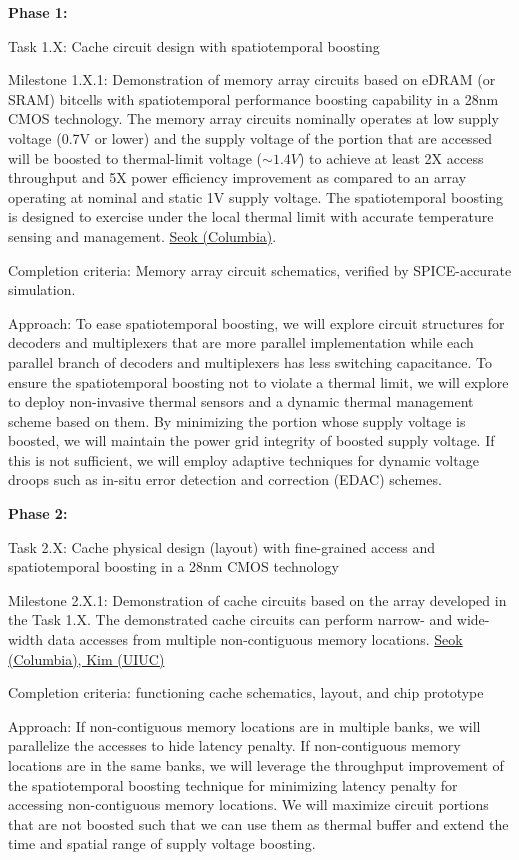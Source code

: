 

\noindent
\textbf{Phase 1:}

Task 1.X: Cache circuit design with spatiotemporal boosting

Milestone 1.X.1: Demonstration of memory array circuits based on eDRAM (or SRAM) bitcells with spatiotemporal performance boosting capability in a 28nm CMOS technology. The memory array circuits nominally operates at low supply voltage (0.7V or lower) and the supply voltage of the portion that are accessed will be boosted to thermal-limit voltage ($\sim 1.4V$) to achieve at least 2X access throughput and 5X power efficiency improvement as compared to an array operating at nominal and static 1V supply voltage. The spatiotemporal boosting is designed to exercise under the local thermal limit with accurate temperature sensing and management. \underline{Seok (Columbia)}. 

   Completion criteria: Memory array circuit schematics, verified by SPICE-accurate simulation.  

   Approach: To ease spatiotemporal boosting, we will explore circuit structures for decoders and multiplexers that are more parallel implementation while each parallel branch of decoders and multiplexers has less switching capacitance. To ensure the spatiotemporal boosting not to violate a thermal limit, we will explore to deploy non-invasive thermal sensors and a dynamic thermal management scheme based on them. By minimizing the portion whose supply voltage is boosted, we will maintain the power grid integrity of boosted supply voltage. If this is not sufficient, we will employ adaptive techniques for dynamic voltage droops such as in-situ error detection and correction (EDAC) schemes. 

\noindent
\textbf{Phase 2:}

Task 2.X: Cache physical design (layout) with fine-grained access and spatiotemporal boosting in a 28nm CMOS technology

Milestone 2.X.1: Demonstration of cache circuits based on the array developed in the Task 1.X. The demonstrated cache circuits can perform narrow- and wide-width data accesses from multiple non-contiguous memory locations. \underline{Seok (Columbia), Kim (UIUC)}

   Completion criteria: functioning cache schematics, layout, and chip prototype

   Approach: If non-contiguous memory locations are in multiple banks, we will parallelize the accesses to hide latency penalty. If non-contiguous memory locations are in the same banks, we will leverage the throughput improvement of the spatiotemporal boosting technique for minimizing latency penalty for accessing non-contiguous memory locations. We will maximize circuit portions that are not boosted such that we can use them as thermal buffer and extend the time and spatial range of supply voltage boosting. 

